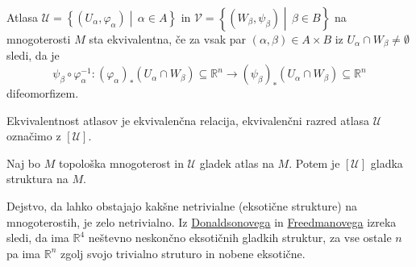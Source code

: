 \begin{definicija} \label{def_ekvivalnentnost_atlasov} Atlasa
$\mathcal{U} = \left\{ \left( U_\alpha, \varphi_\alpha \right)
\middle|\, \alpha \in A\right\}$ in $\mathcal{V} = \left\{
\left( W_\beta, \psi_\beta \right) \middle|\,  \beta
\in  B\right\}$ na mnogoterosti $M$ sta ekvivalentna, če za
vsak par $\left( \alpha, \beta \right) \in  A \times  B$ iz
$U_\alpha \cap  W_\beta \neq \emptyset$ sledi, da je \begin{equation*}
\psi_\beta \circ \varphi_\alpha^{-1} : \left(
\varphi_\alpha \right)_{*}\left( U_\alpha \cap W_\beta \right)
\subseteq  \mathbb{R}^n \to \left( \psi_\beta \right)_{*}\left(
U_\alpha \cap W_\beta \right)\subseteq \mathbb{R}^n \end{equation*} difeomorfizem.
\end{definicija}

\begin{opomba}
Ekvivalentnost atlasov je ekvivalenčna relacija,
ekvivalenčni razred atlasa $\mathcal{U}$ označimo z $\left[
\mathcal{U} \right].$ 
\end{opomba}

\begin{definicija} \label{def_gladka_struktura} Naj bo $M$ topološka
mnogoterost in $\mathcal{U}$ gladek atlas na $M$. Potem je $\left[
\mathcal{U} \right]$ gladka struktura na $M$.    
\end{definicija}

\begin{opomba} Dejstvo, da lahko obstajajo kakšne netrivialne
(eksotične strukture) na mnogoterostih, je zelo netrivialno. Iz
\href{https://en.wikipedia.org/wiki/Donaldson%27s_theorem}{Donaldsonovega}
in \href{https://mathworld.wolfram.com/FreedmanTheorem.html}{Freedmanovega}
izreka sledi, da ima $\mathbb{R}^{4}$ neštevno neskončno
eksotičnih gladkih struktur, za vse ostale $n$ pa ima $\mathbb{R}^n$ 
zgolj svojo trivialno struturo in nobene eksotične.
\end{opomba}